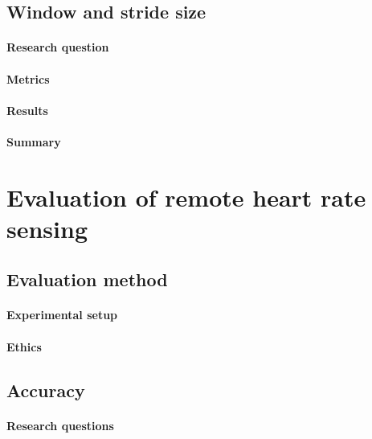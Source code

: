 \subsection{Window and stride size}
\paragraph{Research question}
\paragraph{Metrics}
\paragraph{Results}
\paragraph{Summary}


\section{Evaluation of remote heart rate sensing}
\subsection{Evaluation method}
\paragraph{Experimental setup}
\paragraph{Ethics}
\subsection{Accuracy}

\paragraph{Research questions}
